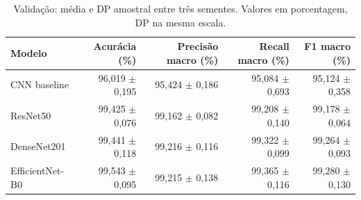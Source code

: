 \begin{table}[htbp]
\centering
\caption{Validação: média e DP amostral entre três sementes. Valores em porcentagem, DP na mesma escala.}
\label{tab:validation-macro}
\small
\begin{tabular}{lrrrr}
\toprule
Modelo & Acurácia (\%) & Precisão macro (\%) & Recall macro (\%) & F1 macro (\%) \\
\midrule
CNN baseline & 96,019 $\pm$ 0,195 & 95,424 $\pm$ 0,186 & 95,084 $\pm$ 0,693 & 95,124 $\pm$ 0,358 \\
ResNet50 & 99,425 $\pm$ 0,076 & 99,162 $\pm$ 0,082 & 99,208 $\pm$ 0,140 & 99,178 $\pm$ 0,064 \\
DenseNet201 & 99,441 $\pm$ 0,118 & 99,216 $\pm$ 0,116 & 99,322 $\pm$ 0,099 & 99,264 $\pm$ 0,093 \\
EfficientNet-B0 & 99,543 $\pm$ 0,095 & 99,215 $\pm$ 0,138 & 99,365 $\pm$ 0,116 & 99,280 $\pm$ 0,130 \\
\bottomrule
\end{tabular}
\end{table}
